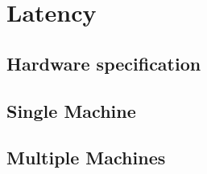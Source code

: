\section{Latency}

\subsection{Hardware specification}
\label{subsec:hardware-spec}


\subsection{Single Machine}
\label{subsec:latency-single-machine}


\subsection{Multiple Machines}
\label{subsec:latency-multiple-machines}
